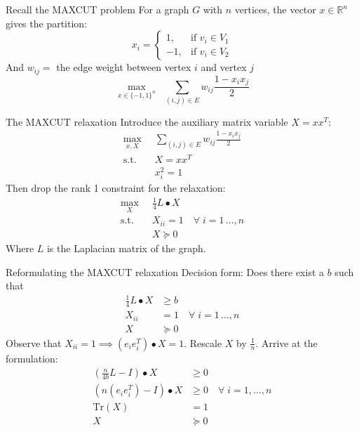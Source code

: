 \documentclass{beamer}
\begin{document}
\begin{frame}{Recall the MAXCUT problem}
For a graph $G$ with $n$ vertices, the vector $x \in \mathbb{R}^n$ gives the partition:
$$
x_i = \begin{cases} 1, & \text{if } v_i \in V_1 \\
-1 , & \text{if } v_i \in V_2
\end{cases}
$$
And $w_{ij} = $ the edge weight between vertex $i$ and vertex $j$
$$
\max_{x \in \{-1,1\}^n}\;\;  \sum_{(i,j) \in E} w_{ij}\frac{1-x_ix_j}{2}
$$
\end{frame}

\begin{frame}{The MAXCUT relaxation}
Introduce the auxiliary matrix variable $X = xx^T$:
\begin{align*}
\max_{x,X} \;\;  & \sum_{(i,j) \in E} w_{ij}\frac{1-x_ix_j}{2} \\
\text{s.t.} \;\; & X = xx^T \\
 & x_i^2 = 1
\end{align*}
Then drop the rank 1 constraint for the relaxation:
\begin{align*}
\max_{X} \;\;  & \frac{1}{4} L \bullet X \\
\text{s.t.} \;\; & X_{ii} = 1 \quad \forall \; i=1\,\ldots,n\\
 & X \succcurlyeq 0
\end{align*}
Where $L$ is the Laplacian matrix of the graph.
\end{frame}

\begin{frame}{Reformulating the MAXCUT relaxation}
Decision form: Does there exist a $b$ such that
\begin{align*}
\frac{1}{4} L \bullet X &\geq b \\
X_{ii} &= 1 \quad \forall \; i=1\,\ldots,n\\
X &\succcurlyeq 0
\end{align*}
Observe that $X_{ii} = 1 \implies (e_ie_i^T)\bullet X = 1$. Rescale $X$ by $\frac{1}{n}$. Arrive at the formulation:
\begin{align*}
\left(\frac{n}{4b} L - I\right) \bullet X &\geq 0 \\
\left(n(e_ie_i^T) - I\right) \bullet X &\geq 0 \quad \forall \; i = 1,\ldots,n \\
\text{Tr}(X) &= 1 \\
X &\succcurlyeq 0
\end{align*}
\end{frame}
\end{document}
